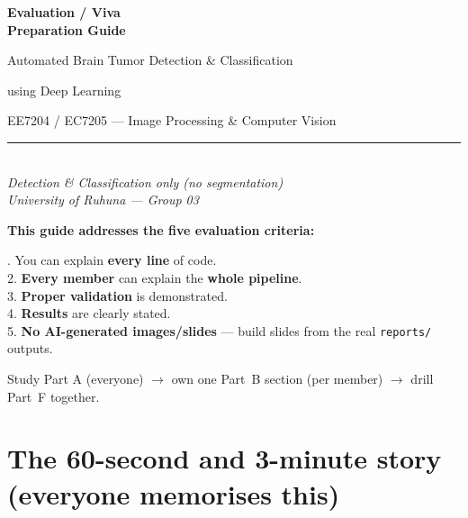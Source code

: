 \documentclass[11pt,a4paper]{article}
\begin{document}
\begin{titlepage}
\centering
\vspace*{2.5cm}
{\color{navy}\Huge\bfseries Evaluation / Viva\\[4pt] Preparation Guide\par}
\vspace{0.8cm}
{\large Automated Brain Tumor Detection \& Classification\par}
{\large using Deep Learning\par}
\vspace{0.5cm}
{\color{accent}\large EE7204 / EC7205 — Image Processing \& Computer Vision\par}
\vspace{1.2cm}
\rule{0.6\textwidth}{0.8pt}\\[6pt]
{\itshape Detection \& Classification only (no segmentation)}\\[4pt]
{\itshape University of Ruhuna — Group 03}\\
\vspace{1.5cm}

\begin{keybox}[width=0.85\textwidth]
\centering\bfseries This guide addresses the five evaluation criteria:\\[4pt]
\begin{flushleft}. You can explain \textbf{every line} of code.\\
2. \textbf{Every member} can explain the \textbf{whole pipeline}.\\
3. \textbf{Proper validation} is demonstrated.\\
4. \textbf{Results} are clearly stated.\\
5. \textbf{No AI-generated images/slides} — build slides from the real \texttt{reports/} outputs.
\end{flushleft}
\end{keybox}

\vfill
{\small Study Part A (everyone) $\rightarrow$ own one Part~B section (per member) $\rightarrow$ drill Part~F together.}
\end{titlepage}

\tableofcontents
\newpage

\section{The 60-second and 3-minute story (everyone memorises this)}
\end{document}
